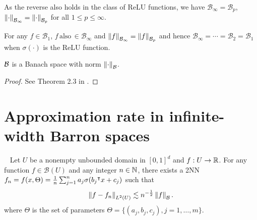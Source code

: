 As the reverse also holds in the class of ReLU functions,  we have
$\mathcal{B}_{\infty} = \mathcal{B}_p$, $\left\| {\cdot} \right\|_{\mathcal{B}_{\infty}} =
    \left\| {\cdot} \right\|_{\mathcal{B}_{p}}$  for all $1 \leq p \leq \infty$.

\begin{proposition}
    \label{prop:equivalence_barron_space}

    For any $f \in \mathcal{B}_1$, $f \,\text{also}\, \in \mathcal{B}_{\infty}$
        and $\left\| {f} \right\|_{\mathcal{B}_{\infty}} = \left\| {f} \right\|_{\mathcal{B}_{p}}$ and hence $
        \mathcal{B}_{\infty} = \cdots = \mathcal{B}_{2} = \mathcal{B}_1$ when
        $\sigma(\cdot)$ is the ReLU function.
\end{proposition}

\begin{proposition}
    \label{prop:barron_space_is_banach}
    $\mathcal{B}$ is a Banach space with norm $\left\| \cdot \right\|_{\mathcal{B}}$.
\end{proposition}

\begin{proof}
    See Theorem 2.3 in \cite[p. 7]{eRepresentationFormulasPointwise2020}.
\end{proof}

\section{Approximation rate in infinite-width Barron spaces}
\label{sec:approximation_in_infinite_width}

\begin{theorem} [Approximation in $\lp{2}$]\
    \label{thm:barron_direct_appro_l2}
    Let $U$ be a nonempty unbounded domain in $[0,1]^d$ and $f: U \to \mathbb{R}$. For
    any function $f \in \mathcal{B}(U)$ and any integer $n \in \mathbb{N}$, there
    exists a 2NN $f_n = f(x, \Theta) = \frac{1}{n}\sum_{j=1}^n a_j \sigma(b_j{}^{\intercal}
    x + c_j)$ such that
    \begin{equation}
        \left\| f - f_n \right\|_{L^{2}(U)}\lesssim n^{-\frac{1}{2}}\left\| f \right\|_{\mathcal{B}}.
    \end{equation}
    where $\Theta$ is the set of parameters $\Theta = \{(a_j, b_j, c_j),
    j=1,\dots,m\}$.

\end{theorem}


